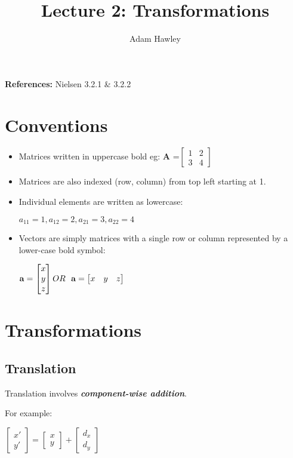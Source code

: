 \documentclass{article}
\author{Adam Hawley}
\title{Lecture 2: Transformations}
\begin{document}
\maketitle
{\bf References:} Nielsen 3.2.1 \& 3.2.2 
\tableofcontents
\newpage

\section{Conventions}
\begin{itemize}
	\item Matrices written in uppercase bold eg:
{\bf A} =$ 
\begin{bmatrix}
1&2\\
3&4
\end{bmatrix}
$
\item Matrices are also indexed (row, column) from top left starting at 1.
\item Individual elements are written as lowercase: 
	\\  \centerline{ $ a_{11} = 1, a_{12} = 2, a_{21} = 3, a_{22} = 4 $ }
\item Vectors are simply matrices with a single row or column represented by a lower-case bold symbol:

	\centerline{ $ {\bf a} = 
		\begin{bmatrix}
			x\\y\\z
		\end{bmatrix} OR \ \ {\bf a} = 
		\begin{bmatrix}
			x&y&z
		\end{bmatrix}
	$ }
\end{itemize}

\section{Transformations}
\subsection{Translation}
Translation involves {\textbf{\textit{component-wise addition}}}.

For example: \\
\centerline{$
\begin{bmatrix}
	x' \\ y'
\end{bmatrix}
=
\begin{bmatrix}
	x \\ y
\end{bmatrix}
+
\begin{bmatrix}
	d_x \\ d_y
\end{bmatrix}
$}
\end{document}
